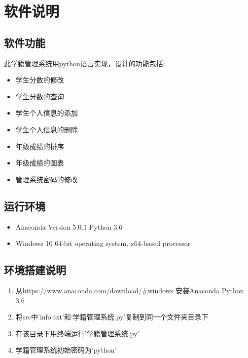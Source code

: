 \documentclass{article}
\begin{document}
\tableofcontents
\newpage

\newpage
\section{软件说明}

\subsection{软件功能}

此学籍管理系统用python语言实现，设计的功能包括:
\begin{itemize}
    \item 学生分数的修改
    \item 学生分数的查询
    \item 学生个人信息的添加
    \item 学生个人信息的删除
    \item 年级成绩的排序
    \item 年级成绩的图表
    \item 管理系统密码的修改
\end{itemize}

\subsection{运行环境}
\begin{itemize} 
\item Anaconda Version 5.0.1 Python 3.6 
\item Windows 10 64-bit operating system, x64-based processor
\end{itemize}

\subsection{环境搭建说明}

\begin{enumerate}
    \item 从https://www.anaconda.com/download/\#windows 安装Anaconda Python 3.6
    \item 将src中'info.txt'和'学籍管理系统.py'复制到同一个文件夹目录下
    \item 在该目录下用终端运行'学籍管理系统.py'
    \item 学籍管理系统初始密码为'python'
\end{enumerate}
\end{document}
